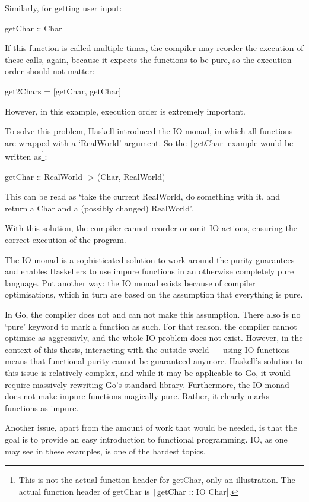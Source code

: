 Similarly, for getting user input:
\begin{haskellcode}
getChar :: Char
\end{haskellcode}
If this function is called multiple times, the compiler may reorder the
execution of these calls, again, because it expects the functions to be
pure, so the execution order should not matter:
\begin{haskellcode}
get2Chars = [getChar, getChar]
\end{haskellcode}
However, in this example, execution order is extremely important.

To solve this problem, Haskell introduced the IO monad, in which
all functions are wrapped with a `RealWorld' argument. So the
\texttt|getChar| example would be written as\footnote{
	This is not the actual function header for getChar, only an illustration.
	The actual function header of getChar is \texttt|getChar :: IO Char|.
}:

\begin{haskellcode}
getChar :: RealWorld -> (Char, RealWorld)
\end{haskellcode}
This can be read as `take the current RealWorld, do something with it,
and return a Char and a (possibly changed) RealWorld'\autocite{haskell-io}.

With this solution, the compiler cannot reorder or omit IO actions, ensuring
the correct execution of the program.

The IO monad is a sophisticated solution to work around the purity guarantees and
enables Haskellers to use impure functions in an otherwise completely pure language.
Put another way: the IO monad exists because of compiler optimisations, which in turn are
based on the assumption that everything is pure.

In Go, the compiler does not and can not make this assumption. There also
is no `pure' keyword to mark a function as such. For that reason, the
compiler cannot optimise as aggressivly, and the whole IO problem does
not exist. However, in the context of this thesis, interacting with the outside world ---
using IO-functions --- means that functional purity cannot be guaranteed anymore.
Haskell's solution to this issue is relatively complex, and while it may be applicable
to Go, it would require massively rewriting Go's standard library. Furthermore,
the IO monad does not make impure functions magically pure. Rather, it
clearly marks functions as impure.

Another issue, apart from the amount of work that would be needed, is that
the goal is to provide an easy introduction to functional programming.
IO, as one may see in these examples, is one of the hardest topics.


